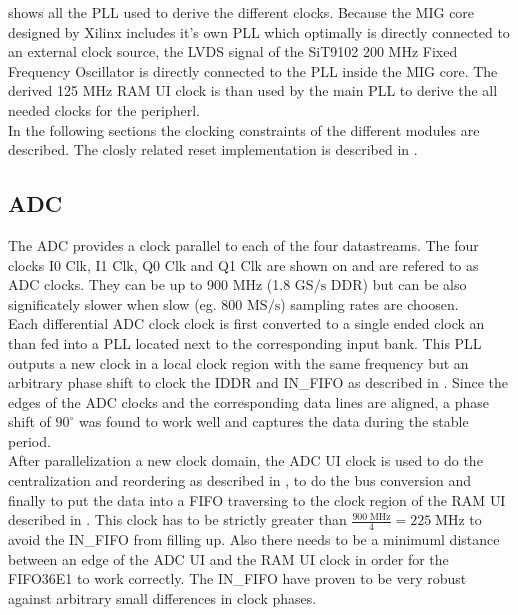  shows all the \gls{PLL} used to derive the
different clocks. Because the \gls{MIG} core designed by Xilinx includes
it's own \gls{PLL} which optimally is directly connected to an external
clock source, the \gls{LVDS} signal of the SiT9102 200 MHz Fixed Frequency
Oscillator is directly connected to the \gls{PLL} inside the \gls{MIG} core.
The derived 125 MHz \gls{RAM} \gls{UI} clock is than used by the main
\gls{PLL} to derive the all needed clocks for the peripherl. \\

In the following sections the clocking constraints of the different modules
are described. The closly related reset implementation is described
in . \\

\subsection{\gls{ADC}}
The \gls{ADC} provides a clock parallel to each of the four datastreams.
The four clocks I0 Clk, I1 Clk, Q0 Clk and Q1 Clk are shown on
 and are refered to as \gls{ADC} clocks.
They can be up to 900 MHz (1.8 $\text{GS}/\text{s}$  \gls{DDR})
but can be also significately slower when slow (eg. 800 $\text{MS}/\text{s}$)
sampling rates are choosen. \\

Each differential \gls{ADC} clock clock is first converted to a single ended
clock an than fed into a \gls{PLL} located next to the corresponding input
bank. This \gls{PLL} outputs a new clock in a local clock region
with the same frequency but an arbitrary phase shift
to clock the IDDR and IN\_FIFO as described in .
Since the edges of the \gls{ADC} clocks and the corresponding data lines
are aligned, a phase shift of $90^\circ$ was found to work well and captures
the data during the stable period. \\

After parallelization a new clock domain, the \gls{ADC} \gls{UI} clock
is used to do the centralization and reordering as described in
,
to do the bus conversion and finally to put the data into a \gls{FIFO}
traversing to the clock region of the \gls{RAM} \gls{UI} described
in . This clock has to be strictly greater than
$\frac{900\;\text{MHz}}{4} = 225\;\text{MHz}$ to avoid the
IN\_FIFO from filling up. Also there needs to be a minimuml
distance between an edge of the \gls{ADC} \gls{UI} and the
\gls{RAM} \gls{UI} clock in order for the FIFO36E1 to work correctly.
The IN\_FIFO have proven to be very robust against arbitrary small
differences in clock phases. \\

